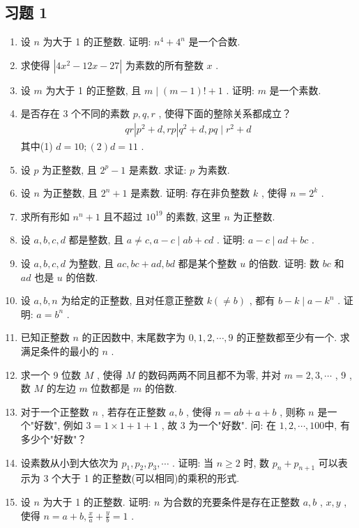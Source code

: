 \subsection*{习题 1}
\begin{enumerate}
	\item 设 $n$ 为大于 1 的正整数. 证明:  $n^{4}+4^{n}$ 是一个合数.
	\item 求使得 $\left|4 x^{2}-12 x-27\right|$ 为素数的所有整数 $x$ .
	\item 设 $m$ 为大于 1 的正整数, 且 $m \mid(m-1)!+1$ . 证明:  $m$ 是一个素数.
	\item 是否存在 3 个不同的素数 $p ,  q ,  r$ , 使得下面的整除关系都成立？
	      \begin{align*}
		      q r\left|p^{2}+d, r p\right| q^{2}+d, p q \mid r^{2}+d
	      \end{align*}
	      其中(1) $d=10 ;  ( 2 ) d=11$ .
	\item 设 $p$ 为正整数, 且 $2^{p}-1$ 是素数. 求证:  $p$ 为素数.
	\item 设 $n$ 为正整数, 且 $2^{n}+1$ 是素数. 证明: 存在非负整数 $k$ , 使得 $n=2^{k}$ .
	\item 求所有形如 $n^{n}+1$ 且不超过 $10^{19}$ 的素数, 这里 $n$ 为正整数.
	\item 设 $a ,  b ,  c ,  d$ 都是整数, 且 $a \neq c, a-c \mid a b+c d$ . 证明:  $a-c \mid a d+b c$ .
	\item 设 $a ,  b ,  c ,  d$ 为整数, 且 $a c ,  b c+a d ,  b d$ 都是某个整数 $u$ 的倍数. 证明: 数 $b c$ 和 $a d$ 也是 $u$ 的倍数.
	\item 设 $a ,  b ,  n$ 为给定的正整数, 且对任意正整数 $k(\neq b)$ , 都有 $b-k \mid a-k^{n}$ . 证明: $a=b^{n}$ .
	\item 已知正整数 $n$ 的正因数中, 末尾数字为 $0,1,2, \cdots, 9$ 的正整数都至少有一个. 求满足条件的最小的 $n$ .
	\item 求一个 9 位数 $M$ , 使得 $M$ 的数码两两不同且都不为零, 并对 $m=2,3, \cdots$ ,  9 , 数 $M$ 的左边 $m$ 位数都是 $m$ 的倍数.
	\item 对于一个正整数 $n$ , 若存在正整数 $a ,  b$ , 使得 $n=a b+a+b$ , 则称 $n$ 是一个"好数", 例如 $3=1 \times 1+1+1$ , 故 3 为一个"好数". 问: 在 $1,2, \cdots, 100$中, 有多少个"好数"？
	\item 设素数从小到大依次为 $p_{1}, p_{2}, p_{3}, \cdots$ . 证明: 当 $n \geqslant 2$ 时, 数 $p_{n}+p_{n+1}$ 可以表示为 3 个大于 1 的正整数(可以相同)的乘积的形式.
	\item 设 $n$ 为大于 1 的正整数. 证明:  $n$ 为合数的充要条件是存在正整数 $a ,  b$ ,  $x ,  y$ , 使得 $n=a+b, \frac{x}{a}+\frac{y}{b}=1$ .

\end{enumerate}
